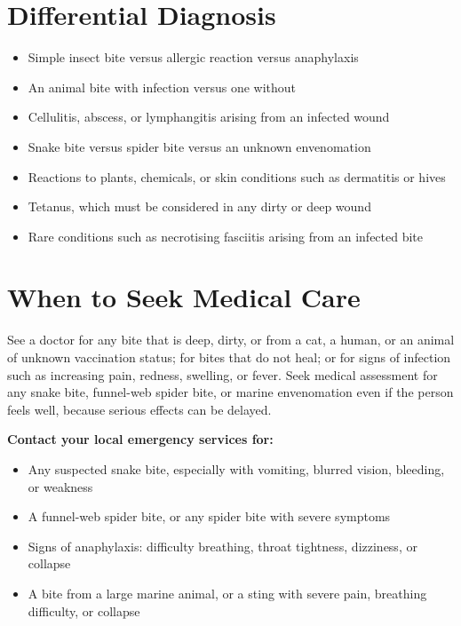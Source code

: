 \section*{Differential Diagnosis}
\begin{itemize}
    \item Simple insect bite versus allergic reaction versus anaphylaxis
    \item An animal bite with infection versus one without
    \item Cellulitis, abscess, or lymphangitis arising from an infected wound
    \item Snake bite versus spider bite versus an unknown envenomation
    \item Reactions to plants, chemicals, or skin conditions such as dermatitis or hives
    \item Tetanus, which must be considered in any dirty or deep wound
    \item Rare conditions such as necrotising fasciitis arising from an infected bite
\end{itemize}

\section*{When to Seek Medical Care}
See a doctor for any bite that is deep, dirty, or from a cat, a human, or an animal of unknown vaccination status; for bites that do not heal; or for signs of infection such as increasing pain, redness, swelling, or fever. Seek medical assessment for any snake bite, funnel-web spider bite, or marine envenomation even if the person feels well, because serious effects can be delayed.

\textbf{Contact your local emergency services for:}
\begin{itemize}
    \item Any suspected snake bite, especially with vomiting, blurred vision, bleeding, or weakness
    \item A funnel-web spider bite, or any spider bite with severe symptoms
    \item Signs of anaphylaxis: difficulty breathing, throat tightness, dizziness, or collapse
    \item A bite from a large marine animal, or a sting with severe pain, breathing difficulty, or collapse
\end{itemize}

